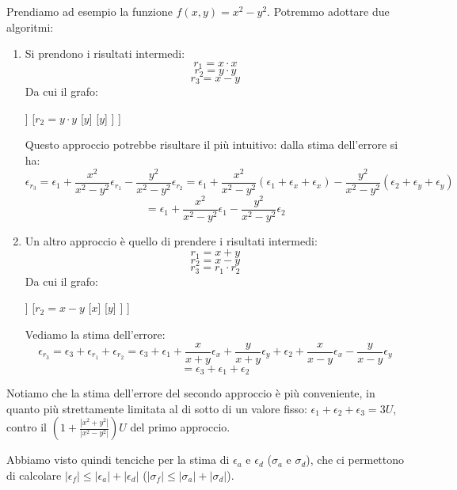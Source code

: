 \documentclass[a4paper,11pt]{article}
\begin{document}
Prendiamo ad esempio la funzione $f(x, y) = x^2 - y^2$.
Potremmo adottare due algoritmi:
\begin{enumerate}
	\item Si prendono i risultati intermedi:
		$$
			r_1 = x \cdot x
		$$
		$$
			r_2 = y \cdot y
		$$
		$$
			r_3 = x - y
		$$
		Da cui il grafo:
		\begin{center}
			\begin{forest}
				[
					{$r_3 = r_1 - r_2$}
					[{$r_1 = x \cdot x$}
						[$x$]
						[$x$]
					]
					[{$r_2 = y \cdot y$}
						[$y$]
						[$y$]
					]
				]	
			\end{forest}
		\end{center}
		Questo approccio potrebbe risultare il più intuitivo: dalla stima dell'errore si ha:
		$$
		\epsilon_{r_3} = \epsilon_1 + \frac{x^2}{x^2 - y^2}\epsilon_{r_1} - \frac{y^2}{x^2 - y^2}\epsilon_{r_2} = \epsilon_1 + \frac{x^2}{x^2 - y^2}(\epsilon_1 + \epsilon_x + \epsilon_x) - \frac{y^2}{x^2 - y^2}(\epsilon_2 + \epsilon_y + \epsilon_y)
		$$
		$$
= \epsilon_1 + \frac{x^2}{x^2 - y^2}\epsilon_1 - \frac{y^2}{x^2 - y^2}\epsilon_2 
		$$
	
	\item Un altro approccio è quello di prendere i risultati intermedi:
		$$
			r_1 = x + y
		$$
		$$
			r_2 = x - y
		$$
		$$
			r_3 = r_1 \cdot r_2
		$$
		Da cui il grafo:
		\begin{center}
			\begin{forest}
				[
					{$r_3 = r_1 \cdot r_2$}
					[{$r_1 = x + y$}
						[$x$]
						[$y$]
					]
					[{$r_2 = x - y$}
						[$x$]
						[$y$]
					]
				]	
			\end{forest}
		\end{center}
		Vediamo la stima dell'errore:
		$$
		\epsilon_{r_3} = \epsilon_3 + \epsilon_{r_1} + \epsilon_{r_2} = \epsilon_3 + \epsilon_1 + \frac{x}{x + y} \epsilon_x + \frac{y}{x + y} \epsilon_y + \epsilon_2 + \frac{x}{x - y} \epsilon_x - \frac{y}{x - y} \epsilon_y 
		$$
		$$
 		= \epsilon_3 + \epsilon_1 + \epsilon_2
		$$
\end{enumerate}
Notiamo che la stima dell'errore del secondo approccio è più conveniente, in quanto più strettamente limitata al di sotto di un valore fisso: $\epsilon_1 + \epsilon_2 + \epsilon_3 = 3U$, contro il $\left( 1 + \frac{|x^2 + y^2|}{|x^2 - y^2|} \right) U$ del primo approccio.

\par\smallskip

Abbiamo visto quindi tenciche per la stima di $\epsilon_a$ e $\epsilon_d$ ($\sigma_a$ e $\sigma_d$), che ci permettono di calcolare $|\epsilon_f| \leq |\epsilon_a| + |\epsilon_d|$ ($|\sigma_f| \leq |\sigma_a| + |\sigma_d|$). 
\end{document}
